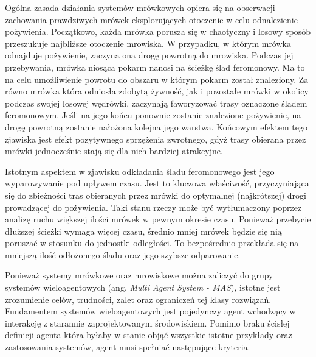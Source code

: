 {    Ogólna zasada działania systemów mrówkowych opiera się na obserwacji zachowania prawdziwych mrówek eksplorujących
    otoczenie w celu odnalezienie pożywienia. Początkowo, każda mrówka porusza się w chaotyczny i losowy sposób
    przeszukuje najbliższe otoczenie mrowiska. W przypadku, w którym mrówka odnajduje pożywienie, zaczyna ona drogę
    powrotną do mrowiska. Podczas jej przebywania, mrówka niosąca pokarm nanosi na ścieżkę ślad feromonowy. Ma to na
    celu umożliwienie powrotu do obszaru w którym pokarm został znaleziony. Za równo mrówka która odniosła zdobytą
    żywność, jak i pozostałe mrówki w okolicy podczas swojej losowej wędrówki, zaczynają faworyzować trasy oznaczone
    śladem feromonowym. Jeśli na jego końcu ponownie zostanie znalezione pożywienie, na drogę powrotną zostanie nałożona
    kolejna jego warstwa. Końcowym efektem tego zjawiska jest efekt pozytywnego sprzężenia zwrotnego, gdyż trasy
    obierana przez mrówki jednocześnie stają się dla nich bardziej atrakcyjne.

    Istotnym aspektem w zjawisku odkładania śladu feromonowego jest jego wyparowywanie pod upływem czasu. Jest to
    kluczowa właściwość, przyczyniająca się do zbieżności tras obieranych przez mrówki do optymalnej (najkrótszej) drogi
    prowadzącej do pożywienia. Taki stanu rzeczy może być wytłumaczony poprzez analizę ruchu większej ilości mrówek w
    pewnym okresie czasu. Ponieważ przebycie dłuższej ścieżki wymaga więcej czasu, średnio mniej mrówek będzie się nią
    poruszać w stosunku do jednostki odległości. To bezpośrednio przekłada się na mniejszą ilość odłożonego śladu oraz
    jego szybsze odparowanie.


    Ponieważ systemy mrówkowe oraz mrowiskowe można zaliczyć do grupy systemów wieloagentowych (ang. \textit{Multi Agent
    System - MAS}), istotne jest zrozumienie celów, trudności, zalet oraz ograniczeń tej klasy rozwiązań. Fundamentem
    systemów wieloagentowych jest pojedynczy agent wchodzący w interakcję z starannie zaprojektowanym środowiskiem.
    Pomimo braku ścisłej definicji agenta która byłaby w stanie objąć wszystkie istotne przykłady oraz zastosowania
    systemów, agent musi spełniać następujące kryteria\cite{Balaji2010AnIT}.

}
